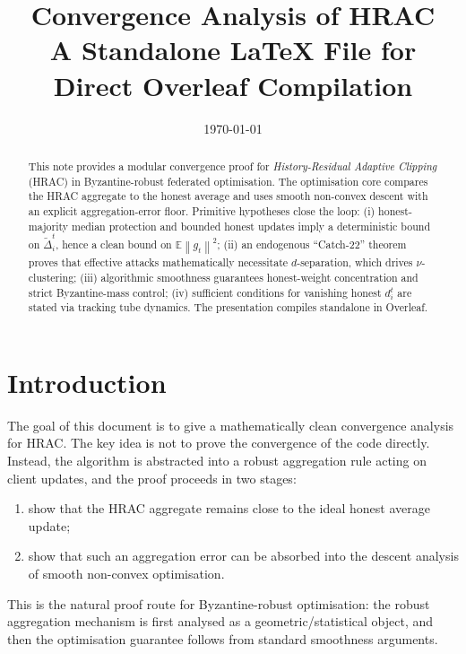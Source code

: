 \documentclass[11pt,a4paper]{article}
\title{\textbf{Convergence Analysis of HRAC}\\
\large A Standalone \LaTeX{} File for Direct Overleaf Compilation}
\author{}
\date{\today}
\theoremstyle{remark}
\newcommand{\E}{\mathbb{E}}
\newcommand{\norm}[1]{\left\lVert #1 \right\rVert}
\begin{document}
\maketitle

\begin{abstract}
This note provides a modular convergence proof for \emph{History-Residual
Adaptive Clipping} (HRAC) in Byzantine-robust federated optimisation.
The optimisation core compares the HRAC aggregate to the honest average and
uses smooth non-convex descent with an explicit aggregation-error floor.
Primitive hypotheses close the loop:
(i) honest-majority median protection and bounded honest updates imply a
deterministic bound on \(\tilde{\Delta}_i^t\), hence a clean bound on
\(\E\norm{g_t}^2\);
(ii) an endogenous ``Catch-22'' theorem proves that effective attacks mathematically necessitate \(d\)-separation, which drives \(\nu\)-clustering;
(iii) algorithmic smoothness guarantees honest-weight concentration and strict Byzantine-mass control;
(iv) sufficient conditions for vanishing honest \(d_i^t\) are stated via tracking tube dynamics.
The presentation compiles standalone in Overleaf.
\end{abstract}

\tableofcontents

\section{Introduction}

The goal of this document is to give a mathematically clean convergence
analysis for HRAC.
The key idea is not to prove the convergence of the code directly.
Instead, the algorithm is abstracted into a robust aggregation rule acting on
client updates, and the proof proceeds in two stages:

\begin{enumerate}[label=\arabic*.]
    \item show that the HRAC aggregate remains close to the ideal honest
    average update;
    \item show that such an aggregation error can be absorbed into the descent
    analysis of smooth non-convex optimisation.
\end{enumerate}

This is the natural proof route for Byzantine-robust optimisation:
the robust aggregation mechanism is first analysed as a geometric/statistical
object, and then the optimisation guarantee follows from standard smoothness
arguments.
\end{document}
